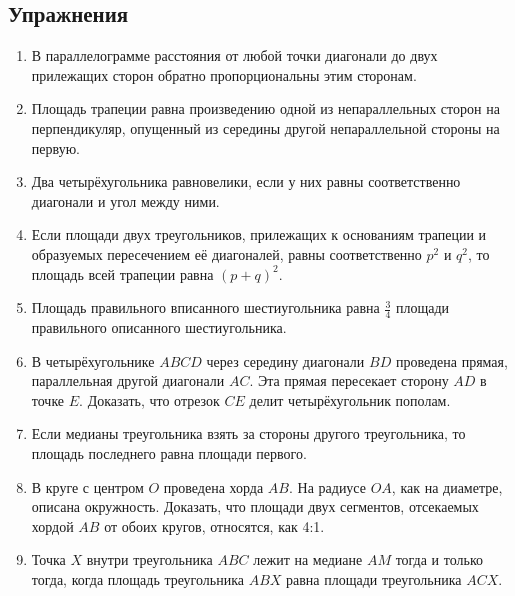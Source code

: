 {\small

\subsection*{Упражнения}

\begin{center}
\end{center}

\begin{enumerate}[noitemsep]
\item
В параллелограмме расстояния от любой точки диагонали до двух прилежащих сторон обратно пропорциональны этим сторонам.

\item
Площадь трапеции равна произведению одной из непараллельных сторон на перпендикуляр, опущенный из середины другой непараллельной стороны на первую.

\item
Два четырёхугольника равновелики, если у них равны соответственно диагонали и угол между ними.

\item
Если площади двух треугольников, прилежащих к основаниям трапеции и образуемых пересечением её диагоналей, равны соответственно $p^2$ и $q^2$, то площадь всей трапеции равна $(p+q)^2$.

\item
Площадь правильного вписанного шестиугольника равна $\tfrac34$ площади правильного описанного шестиугольника.

\item
В четырёхугольнике $ABCD$ через середину диагонали $BD$ проведена прямая, параллельная другой диагонали $AC$.
Эта прямая пересекает сторону $AD$ в точке $E$.
Доказать, что отрезок $CE$ делит четырёхугольник пополам.

\item
Если медианы треугольника взять за стороны другого треугольника, то площадь последнего равна площади первого.

\item
В круге с центром $O$ проведена хорда $AB$.
На радиусе $OA$, как на диаметре, описана окружность.
Доказать, что площади двух сегментов, отсекаемых хордой $AB$ от обоих кругов, относятся, как 4:1.

\item Точка $X$ внутри треугольника $ABC$ лежит на медиане $AM$ тогда и только тогда, когда площадь треугольника $ABX$ равна площади треугольника $ACX$.


\end{enumerate}}
